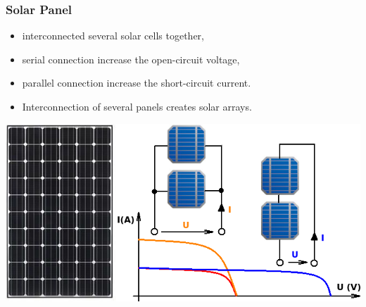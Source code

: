 \documentclass{beamer}
\begin{document}
	\begin{frame}
    \frametitle{Solar Panel}
		
		\begin{itemize}
			\item interconnected several solar cells together,
			\item serial connection increase the open-circuit voltage,
			\item parallel connection increase the short-circuit current.
			\item Interconnection of several panels creates solar arrays.
		\end{itemize}
		\begin{center}
			\includegraphics[scale=0.4]{obr09_panel.png}
		\end{center}
	\end{frame}
\end{document}
